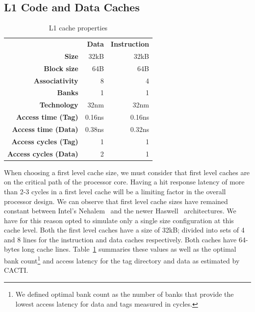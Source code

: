 \subsection{L1 Code and Data Caches}

\begin{table}[ht]
\centering
\begin{tabular}{rrr}
\toprule
                          & \bf{Data}     & \bf{Instruction} \\
\bf{Size}                 & 32kB          & 32kB      \\
\bf{Block size}           & 64B           & 64B       \\
\bf{Associativity}        & 8             & 4         \\
\bf{Banks}                & 1             & 1         \\
\bf{Technology}           & 32nm          & 32nm      \\
\bf{Access time (Tag)}    & 0.16ns        & 0.16ns    \\
\bf{Access time (Data)}   & 0.38ns        & 0.32ns    \\
\bf{Access cycles (Tag)}  & 1             & 1         \\
\bf{Access cycles (Data)} & 2             & 1         \\
\bottomrule
\end{tabular}
\caption{L1 cache properties}
\label{tbl:processor_model:l1}
\end{table}

When choosing a first level cache size, we must consider that first level caches are on the critical path of the processor core.
Having a hit response latency of more than 2-3 cycles in a first level cache will be a limiting factor in the overall processor design.
We can observe that first level cache sizes have remained constant between Intel's Nehalem~\cite{Thomadakis2011} and the newer Haswell~\cite{Jain2013} architectures.
We have for this reason opted to simulate only a single size configuration at this cache level.
Both the first level caches have a size of 32kB; divided into sets of 4 and 8 lines for the instruction and data caches respectively. 
Both caches have 64-bytes long cache lines.
Table~\ref{tbl:processor_model:l1} summaries these values as well as the optimal bank count\footnote{We defined optimal bank count as the number of banks that provide the lowest access latency for data and tags measured in cycles.} and access latency for the tag directory and data as estimated by CACTI. 

